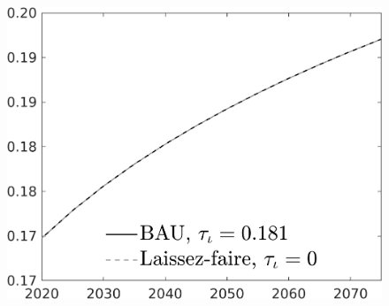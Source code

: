 \documentclass[12pt]{article}
\begin{document}
\begin{figure}[h!!]
\begin{minipage}[]{0.32\textwidth}
	\end{minipage}	
	\begin{minipage}[]{0.32\textwidth}
		\includegraphics[width=1\textwidth]{../../codding_model/own_basedOnFried/optimalPol_010922_revision/figures/all_13Sept22/CompTaul_LFBAU_Reg0_LgLf_spillover0_nsk1_xgr0_knspil0_sep1_countec0_GovRev0_etaa0.79_lgd1.png}
	\end{minipage}	
\end{figure}
\end{document}
